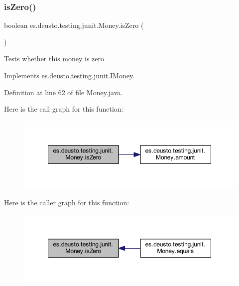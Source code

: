 \mbox{\label{classes_1_1deusto_1_1testing_1_1junit_1_1_money_a797658a03260b535e9a36ebbcc3b19c9}} 
\subsubsection{\texorpdfstring{is\+Zero()}{isZero()}}
{\footnotesize\ttfamily boolean es.\+deusto.\+testing.\+junit.\+Money.\+is\+Zero (\begin{DoxyParamCaption}{ }\end{DoxyParamCaption})}

Tests whether this money is zero 

Implements \mbox{\hyperlink{interfacees_1_1deusto_1_1testing_1_1junit_1_1_i_money_a166c39b6f931e49769580a04f8c73500}{es.\+deusto.\+testing.\+junit.\+I\+Money}}.



Definition at line 62 of file Money.\+java.

Here is the call graph for this function\+:\nopagebreak
\begin{figure}[H]
\begin{center}
\leavevmode
\includegraphics[width=348pt]{classes_1_1deusto_1_1testing_1_1junit_1_1_money_a797658a03260b535e9a36ebbcc3b19c9_cgraph}
\end{center}
\end{figure}
Here is the caller graph for this function\+:\nopagebreak
\begin{figure}[H]
\begin{center}
\leavevmode
\includegraphics[width=348pt]{classes_1_1deusto_1_1testing_1_1junit_1_1_money_a797658a03260b535e9a36ebbcc3b19c9_icgraph}
\end{center}
\end{figure}
\mbox{\label{classes_1_1deusto_1_1testing_1_1junit_1_1_money_a02c7d4e9013710f70d1d46e9c9ebae88}} 
